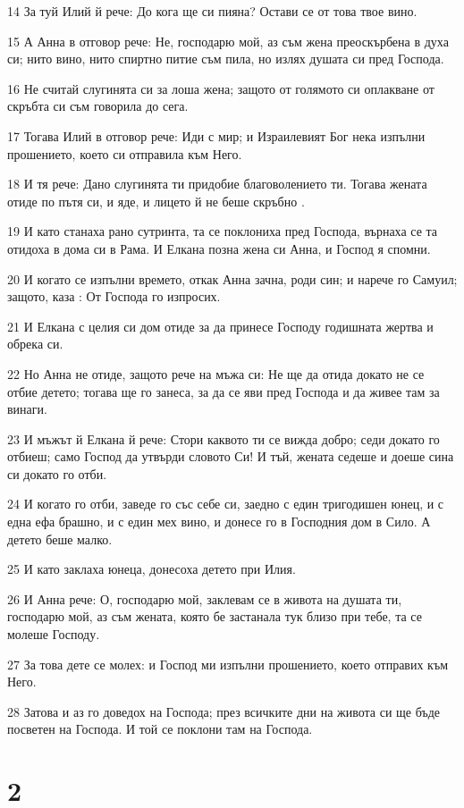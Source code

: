 \par 14 За туй Илий й рече: До кога ще си пияна? Остави се от това твое вино.
\par 15 А Анна в отговор рече: Не, господарю мой, аз съм жена преоскърбена в духа си; нито вино, нито спиртно питие съм пила, но излях душата си пред Господа.
\par 16 Не считай слугинята си за лоша жена; защото от голямото си оплакване от скръбта си съм говорила до сега.
\par 17 Тогава Илий в отговор рече: Иди с мир; и Израилевият Бог нека изпълни прошението, което си отправила към Него.
\par 18 И тя рече: Дано слугинята ти придобие благоволението ти. Тогава жената отиде по пътя си, и яде, и лицето й не беше скръбно .
\par 19 И като станаха рано сутринта, та се поклониха пред Господа, върнаха се та отидоха в дома си в Рама. И Елкана позна жена си Анна, и Господ я спомни.
\par 20 И когато се изпълни времето, откак Анна зачна, роди син; и нарече го Самуил; защото, каза : От Господа го изпросих.
\par 21 И Елкана с целия си дом отиде за да принесе Господу годишната жертва и обрека си.
\par 22 Но Анна не отиде, защото рече на мъжа си: Не ще да отида докато не се отбие детето; тогава ще го занеса, за да се яви пред Господа и да живее там за винаги.
\par 23 И мъжът й Елкана й рече: Стори каквото ти се вижда добро; седи докато го отбиеш; само Господ да утвърди словото Си! И тъй, жената седеше и доеше сина си докато го отби.
\par 24 И когато го отби, заведе го със себе си, заедно с един тригодишен юнец, и с една ефа брашно, и с един мех вино, и донесе го в Господния дом в Сило. А детето беше малко.
\par 25 И като заклаха юнеца, донесоха детето при Илия.
\par 26 И Анна рече: О, господарю мой, заклевам се в живота на душата ти, господарю мой, аз съм жената, която бе застанала тук близо при тебе, та се молеше Господу.
\par 27 За това дете се молех: и Господ ми изпълни прошението, което отправих към Него.
\par 28 Затова и аз го доведох на Господа; през всичките дни на живота си ще бъде посветен на Господа. И той се поклони там на Господа.

\chapter{2}

